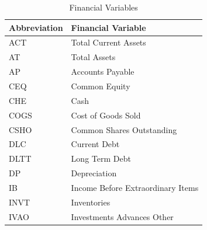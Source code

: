 \documentclass[conference]{IEEEtran}
\begin{document}
\begin{table}[htbp]
\caption{Financial Variables}
\centering
\begin{tabular}{@{}p{3.4cm}p{5cm}@{}} 
\toprule
\textbf{\hspace{5mm}Abbreviation} & \textbf{Financial Variable\hspace{5mm}} \\
\midrule
\hspace{5mm}ACT & Total Current Assets\hspace{5mm} \\
\hspace{5mm}AT & Total Assets\hspace{5mm} \\
\hspace{5mm}AP & Accounts Payable\hspace{5mm} \\
\hspace{5mm}CEQ & Common Equity\hspace{5mm} \\
\hspace{5mm}CHE & Cash\hspace{5mm} \\
\hspace{5mm}COGS & Cost of Goods Sold\hspace{5mm} \\
\hspace{5mm}CSHO & Common Shares Outstanding\hspace{5mm} \\
\hspace{5mm}DLC & Current Debt\hspace{5mm} \\
\hspace{5mm}DLTT & Long Term Debt\hspace{5mm} \\
\hspace{5mm}DP & Depreciation\hspace{5mm} \\
\hspace{5mm}IB & Income Before Extraordinary Items\hspace{5mm} \\
\hspace{5mm}INVT & Inventories\hspace{5mm} \\
\hspace{5mm}IVAO & Investments Advances Other\hspace{5mm} \\

\end{tabular}
\end{table}
\end{document}
